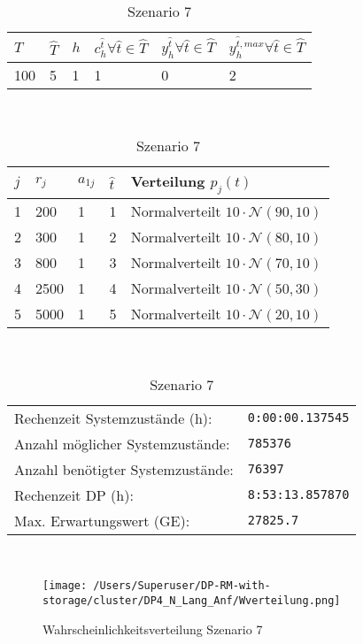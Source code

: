 \begin{table}[h!]
\renewcommand{\arraystretch}{1.5}
  \begin{center}
    \caption{Szenario 7}  \label{S7}
    \vspace*{3mm}
    \begin{tabular}{l l l l l l}   %
    $T$ & $\hat T$  & $h$ & $c_h^{\hat t}\forall \hat{t}\in{\hat T}$ & $y_h^{\hat t}\forall \hat{t}\in{\hat T}$  & $y_h^{{\hat t},max}\forall \hat{t}\in{\hat T}$  \\  \hline
100 & 5 & 1 & 1 & 0 & 2  \\ \hline
    \end{tabular} \\[3mm]
        \begin{tabular}{p{1cm} p{1cm} p{1cm}  p{1cm} p{6cm}}   %
    $j$ & $r_j$  & $a_{1j}$ & $\hat t$ & Verteilung $p_j(t)$ \\  \hline
1 & 200 & 1 & 1 & Normalverteilt $10\cdot\mathcal{N}(90, 10)$   \\
2 & 300 & 1 & 2 & Normalverteilt $10\cdot\mathcal{N}(80, 10)$  \\
3 & 800 & 1 & 3 & Normalverteilt $10\cdot\mathcal{N}(70, 10)$  \\
4 & 2500 & 1 & 4 & Normalverteilt $10\cdot\mathcal{N}(50, 30)$  \\
5 & 5000 & 1 & 5 & Normalverteilt $10\cdot\mathcal{N}(20, 10)$ \\
\hline
    \end{tabular} \\[3mm]
     \begin{tabular}{p{7cm}p{5cm}} \hline
     Rechenzeit Systemzustände (h): & \texttt{0:00:00.137545} \\
     Anzahl möglicher Systemzustände: & \texttt{785376} \\
     Anzahl benötigter Systemzustände: & \texttt{76397} \\ 
     Rechenzeit DP (h): & \texttt{8:53:13.857870} \\ 
          Max. Erwartungswert (GE): & \texttt{27825.7} \\ \hline
         \end{tabular} \\[3mm]
  \end{center}
\end{table}

\clearpage
\begin{figure}[h!]
  \begin{center}
    \texttt{[image: /Users/Superuser/DP-RM-with-storage/cluster/DP4\_N\_Lang\_Anf/Wverteilung.png]}
    \caption{Wahrscheinlichkeitsverteilung Szenario 7}  \label{SB7}
  \end{center}
\end{figure}

